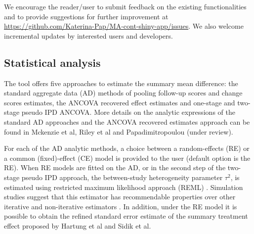 \documentclass[AMA,STIX1COL]{WileyNJD-v2}
\begin{document}
We encourage the reader/user to submit feedback on the existing functionalities and to provide suggestions for further improvement at \url{https://github.com/Katerina-Pap/MA-cont-shiny-app/issues}. We also welcome incremental updates by interested users and developers.

\subsection{Statistical analysis}

The tool offers five approaches to estimate the summary mean difference: the standard aggregate data (AD) methods of pooling follow-up scores and change scores estimates, the ANCOVA recovered effect estimates and one-stage and two-stage pseudo IPD ANCOVA. More details on the analytic expressions of the standard AD approaches and the ANCOVA recovered estimates approach can be found in Mckenzie et al\cite{mckenzie2016impact}, Riley et al\cite{riley2013meta} and Papadimitropoulou (under review).

For each of the AD analytic methods, a choice between a random-effects (RE) or a common (fixed)-effect (CE) model \citep{hedges1985statistical, Borenstein2009} is provided to the user (default option is the RE). When RE models are fitted on the AD, or in the second step of the two-stage pseudo IPD approach, the between-study heterogeneity parameter $\tau^2$, is estimated using restricted maximum likelihood approach (REML) \citep{raudenbush2009analyzing}. Simulation studies suggest that this estimator has recommendable properties over other iterative and non-iterative estimators \citep{viechtbauer2005bias, veroniki2016methods}. In addition, under the RE model it is possible to obtain the refined standard error estimate of the summary treatment effect proposed by Hartung et al\cite{HartungJ.Knapp2001} and Sidik et al\cite{sidik2002simple}.
\end{document}
